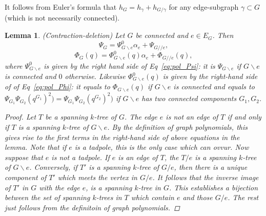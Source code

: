 \documentclass[11pt]{article}
\newtheorem{lemma}[thm]{Lemma}
\begin{document}
It follows from Euler's formula that
$h_G=h_\gamma+h_{G/\gamma}$
for any edge-subgraph $\gamma\subset G$ (which is not necessarily connected).
\begin{lemma}
(Contraction-deletion) Let $G$ be connected and $e\in E_G$. Then
$$
\Psi_G=\Psi_{G\backslash e}^0\alpha_e+\Psi_{G//e},
$$
$$
\Phi_G(q)=\Phi^0_{G\backslash e}(q)\alpha_e+\Phi_{G//e}(q),
$$
where $\Psi_{G\backslash e}^0$ is given by the right hand side of Eq~\ref{eq:pol_Psi}: it is $\Psi_{G\backslash e}$ if $G\backslash e$ is connected and $0$ otherwise. Likewise $\Phi_{G\backslash e}^0(q)$ is given by the right-hand side of of Eq~\ref{eq:pol_Phi}: it equals to $\Phi_{G\backslash e}(q)$ if $G\backslash e$ is connected and equals to $\Psi_{G_1}\Psi_{G_2}(q^{G_1})^2)=\Psi_{G_1}\Psi_{G_2}(q^{G_2})^2)$ if $G\backslash e$ has two connected components $G_1, G_2$.
\begin{proof}
Let $T$ be a spanning $k$-tree of $G$. The edge $e$ is not an edge of $T$ if and only if $T$ is a spanning $k$-tree of $G\backslash e$. By the definition of graph polynomials, this gives rise to the first terms in the right-hand side of above equations in the lemma. Note that if $e$ is a tadpole, this is the only case which can ovvur. Now suppose that $e$ is not a tadpole. If $e$ is an edge of $T$, the $T/e$ is a spanning $k$-tree of $G\backslash e$. Conversely, if $T'$ is a spanning $k$-tree of $G/e$, then there is a unique component of $T'$ which meets the vertex in $G/e$. It follows that the inverse image of $T'$ in $G$ with the edge $e$, is a spanning $k$-tree in $G$. This establishes a bijection between the set of spanning $k$-trees in $T$ which contain $e$ and those $G/e$. The rest just follows from the definitoin of graph polynomials.
\end{proof} 
\end{lemma}
\end{document}
